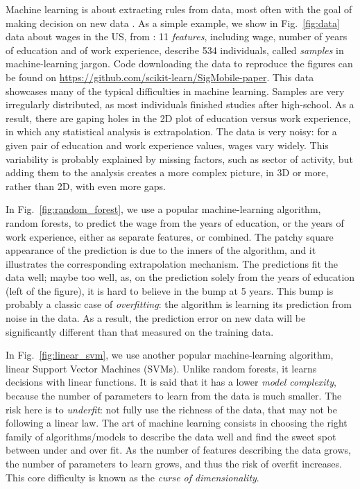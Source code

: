 \documentclass[a4paper]{article}
\begin{document}
Machine learning is about extracting rules from data, most often with the
goal of making decision on new data \cite{elemstatlearn}. As a simple example, we show in
Fig.~\ref{fig:data} data about wages in the US, from \cite{berndt1991}:
11 \emph{features}, including wage, number of years of education and of work
experience, describe 534 individuals,
called \emph{samples} in machine-learning jargon.
Code downloading the data to reproduce the figures can be found on
\url{https://github.com/scikit-learn/SigMobile-paper}.
%
This data showcases many of the typical difficulties in machine learning.
Samples are very irregularly distributed, as most individuals
finished studies after high-school. As a result, there are gaping
holes in the 2D plot of education versus work experience, in which any
statistical analysis is extrapolation. The data is very noisy: for a
given pair of education and work experience values, wages vary widely.
This variability
is probably explained by missing factors, such as sector of
activity, but adding them to the analysis creates a more complex picture,
in 3D or more, rather than 2D, with even more gaps.

In Fig.~\ref{fig:random_forest}, we use a popular machine-learning
algorithm, random forests, to predict the wage from the years of
education, or the years of work experience, either as separate features,
or combined. The patchy square appearance of the prediction is due to the
inners of the algorithm, and it illustrates the corresponding
extrapolation mechanism. The predictions fit the data well; maybe too
well, as, on the prediction solely from the years of education (left of
the figure), it is hard to believe in the bump at 5 years. This bump is
probably a classic case of \emph{overfitting}: the algorithm is learning its
prediction from noise in the data. As a result, the prediction error on
new data will be significantly different than that measured on the
training data.


In Fig.~\ref{fig:linear_svm}, we use another popular machine-learning
algorithm, linear Support Vector Machines (SVMs). Unlike random forests,
it learns decisions with linear functions. It is said that
it has a lower \emph{model complexity}, because the number of parameters
to learn from the data is much smaller. The risk here is to
\emph{underfit}: not fully use the richness of the data, that may not be
following a linear law. The art of machine learning consists in choosing
the right family of algorithms/models to describe the data well and
find the sweet spot between under and over fit. As the number of features
describing the data grows, the number of parameters to learn grows, and
thus the risk of overfit increases. This core difficulty is known as the
\emph{curse of dimensionality}.
\end{document}

